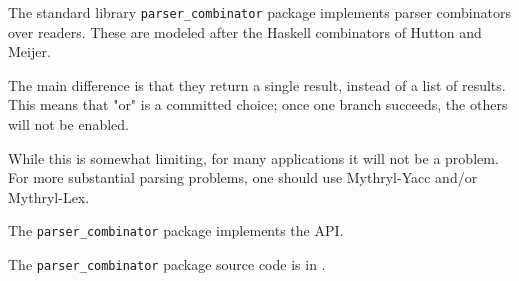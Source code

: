 
The standard library {\tt parser\_combinator} package implements parser 
combinators over readers. 
These are modeled after the Haskell 
combinators of Hutton and Meijer.

The main difference is that they 
return a single result, instead of a list of results.  This means that 
"or" is a committed choice; once one branch succeeds, the others will not 
be enabled.

While this is somewhat limiting, for many applications it 
will not be a problem. 
For more substantial parsing problems, one should 
use Mythryl-Yacc and/or Mythryl-Lex.

The {\tt parser\_combinator} package implements the  API.

The {\tt parser\_combinator} package source code is in .

